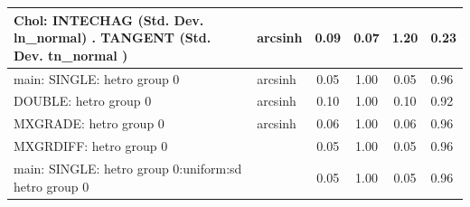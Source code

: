 \begin{table}
\begin{center}
\begin{tabular}{|l|l|c|c|c|l|}
			\hline
			 Chol: INTECHAG (Std. Dev. ln_normal) . TANGENT (Std. Dev.   tn_normal ) & arcsinh & 0.09 & 0.07 & 1.20 & 0.23 \\
			\hline
			main: SINGLE: hetro group 0 & arcsinh & 0.05 & 1.00 & 0.05 & 0.96 \\
			\hline
			DOUBLE: hetro group 0 & arcsinh & 0.10 & 1.00 & 0.10 & 0.92 \\
			\hline
			MXGRADE: hetro group 0 & arcsinh & 0.06 & 1.00 & 0.06 & 0.96 \\
			\hline
			MXGRDIFF: hetro group 0 &  & 0.05 & 1.00 & 0.05 & 0.96 \\
			\hline
			main: SINGLE: hetro group 0:uniform:sd  hetro group 0 &  & 0.05 & 1.00 & 0.05 & 0.96 \\
			\hline
		\end{tabular}
	\end{center}
\end{table}
